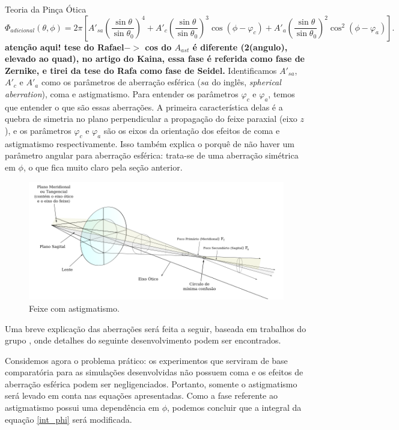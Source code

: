 \begin{chapter}{Teoria da Pinça Ótica}
\begin{equation}
\Phi_{adicional}(\theta,\phi) = 2\pi \left[ A'_{sa}\left( \frac{\sin\theta}{\sin\theta_0} \right)^4 + A'_{c}\left( \frac{\sin\theta}{\sin\theta_0} \right)^3\cos(\phi - \varphi_c) + A'_{a}\left( \frac{\sin\theta}{\sin\theta_0} \right)^2\cos^2(\phi - \varphi_a) \right].
\end{equation}
{\bf atenção aqui! tese do Rafael$->$ cos do $A_{ast}$ é diferente (2(angulo), elevado ao quad), no artigo do Kaina, essa fase é referida como fase de Zernike, e tirei da tese do Rafa como fase de Seidel. }
%
Identificamos $A'_{sa}$, $A'_{c}$ e $A'_{a}$ como os parâmetros de aberração esférica ($sa$ do inglês, {\it spherical aberration}), coma e astigmatismo. Para entender os parâmetros $\varphi_c$ e $\varphi_a$, temos que entender o que são essas aberrações. A primeira característica delas é a quebra de simetria no plano perpendicular a propagação do feixe paraxial (eixo $z$), e os parâmetros $\varphi_c$ e $\varphi_a$ são os eixos da orientação dos efeitos de coma e astigmatismo respectivamente. Isso também explica o porquê de não haver um parâmetro angular para aberração esférica: trata-se de uma aberração simétrica em $\phi$, o que fica muito claro pela seção anterior.
%
\begin{figure}[h]
\begin{center}
\includegraphics[scale=.7]{feixe_astig}
\caption{Feixe com astigmatismo.}
\label{feixe_astig}
\end{center}
\end{figure}
%

Uma breve explicação das aberrações será feita a seguir, baseada em trabalhos do grupo \cite{Dutra, Diniz2019, Dutra2014}, onde detalhes do seguinte desenvolvimento podem ser encontrados. 

Considemos agora o problema prático: os experimentos que serviram de base comparatória para as simulações desenvolvidas não possuem coma e os efeitos de aberração esférica podem ser negligenciados. Portanto, somente o astigmatismo será levado em conta nas equações apresentadas. Como a fase referente ao astigmatismo possui uma dependência em $\phi$, podemos concluir que a integral da equação \ref{int_phi} será modificada. 


\end{chapter}
